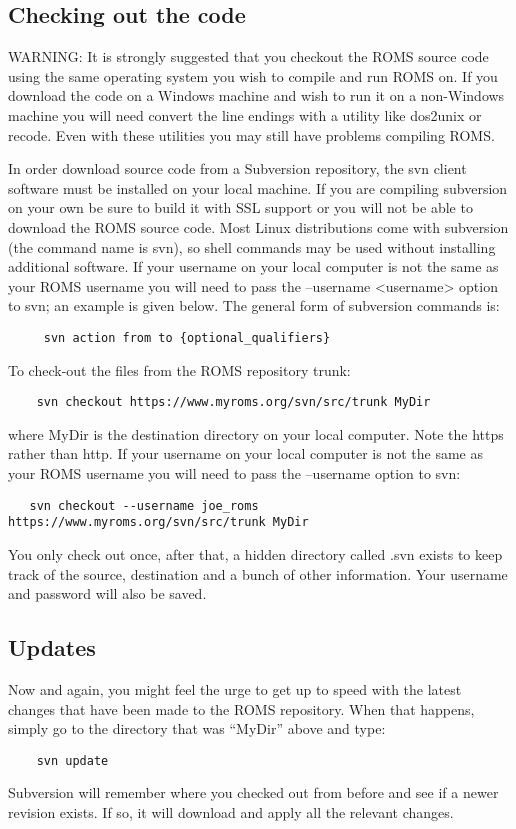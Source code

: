 \subsection{Checking out the code}
WARNING: It is strongly suggested that you checkout the ROMS source
code using the same operating system you wish to compile and run
ROMS on. If you download the code on a Windows machine and wish to
run it on a non-Windows machine you will need convert the line
endings with a utility like dos2unix or recode. Even with these
utilities you may still have problems compiling ROMS.

In order download source code from a Subversion repository, the svn
client software must be installed on your local machine. If you are
compiling subversion on your own be sure to build it with SSL
support or you will not be able to download the ROMS source code.
Most Linux distributions come with subversion (the command name is
svn), so shell commands may be used without installing additional
software. If your username on your local computer is not the same as
your ROMS username you will need to pass the --username <username>
option to svn; an example is given below. The general form of
subversion commands is: 
\begin{verbatim}
     svn action from to {optional_qualifiers} 
\end{verbatim}
To check-out the files from the ROMS repository trunk:
\begin{verbatim}
    svn checkout https://www.myroms.org/svn/src/trunk MyDir
\end{verbatim}
where MyDir is the destination directory on your local computer.
Note the https rather than http. If your username on your local
computer is not the same as your ROMS username you will need to pass
the --username option to svn:
\begin{verbatim}
   svn checkout --username joe_roms https://www.myroms.org/svn/src/trunk MyDir
\end{verbatim}
You only check out once, after that, a hidden directory called .svn
exists to keep track of the source, destination and a bunch of other
information. Your username and password will also be saved.

\subsection{Updates}
Now and again, you might feel the urge to get up to speed with the
latest changes that have been made to the ROMS repository. When that
happens, simply go to the directory that was ``MyDir'' above and
type:
\begin{verbatim}
    svn update
\end{verbatim}
Subversion will remember where you checked out from before and
see if a newer revision exists. If so, it will download and apply
all the relevant changes.

